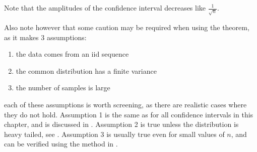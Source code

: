 Note that the amplitudes of the confidence
interval decreases like $\frac{1}{\sqrt{n}}$.

Also note however that some caution may be
required when using the theorem, as it makes 3
assumptions: \noitemsep
 \begin{enumerate}
    \item the data comes from an iid sequence
    \item the common distribution has a finite
    variance
    \item the number of samples is large
 \end{enumerate} each of these assumptions is worth screening, as there are
 realistic cases where they do not hold. Assumption 1 is the same as for all confidence intervals in this chapter, and
is discussed in . Assumption 2 is true
unless the distribution is heavy tailed, see .
Assumption 3 is usually true even for small values of $n$, and
can be verified using the method in
.

